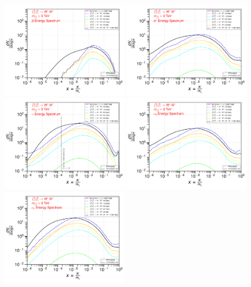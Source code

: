 \documentclass[epj,nopacs,fleqn]{svjour}
\begin{document}
\begin{figure}[!h]
	\centering
	\subfigure
	{ \includegraphics[width=0.48\textwidth]{Fig/n1ww_comparison/3000_antiprotons_n1ww_comparison.pdf} } 
	\subfigure
	{\includegraphics[width=0.48\textwidth]{Fig/n1ww_comparison/3000_positrons_n1ww_comparison.pdf} }
	\subfigure
	{\includegraphics[width=0.48\textwidth]{Fig/n1ww_comparison/3000_gammas_n1ww_comparison.pdf} }
	\subfigure
	{\includegraphics[width=0.48\textwidth]{Fig/n1ww_comparison/3000_neutrinos_e_n1ww_comparison.pdf} }
	\subfigure
	{\includegraphics[width=0.48\textwidth]{Fig/n1ww_comparison/3000_neutrinos_mu_n1ww_comparison.pdf} }

\end{figure}
\end{document}
